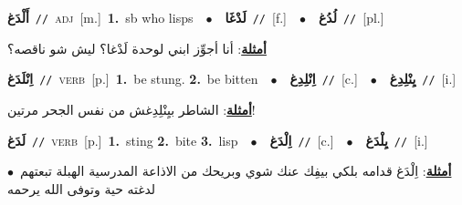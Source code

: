 \documentclass[10pt,a4paper,twoside]{article} %
\begin{document}
\begin{multicols}{2}
{\setlength\topsep{0pt}\textbf{\foreignlanguage{arabic}{أَلْدَغ}}\ {\color{gray}\texttt{//}\color{black}}\ \textsc{adj}\ [m.]\ \textbf{1.}~sb who lisps\ \ $\bullet$\ \ \setlength\topsep{0pt}\textbf{\foreignlanguage{arabic}{لَدْغَا}}\ {\color{gray}\texttt{//}\color{black}}\ [f.]\ \ $\bullet$\ \ \setlength\topsep{0pt}\textbf{\foreignlanguage{arabic}{لُدُغ}}\ {\color{gray}\texttt{//}\color{black}}\ [pl.]\  \begin{flushright}\color{gray}\foreignlanguage{arabic}{\textbf{\underline{\foreignlanguage{arabic}{أمثلة}}}: أنا أجوِّز ابني لوحدة لَدْغا؟ ليش شو ناقصه؟}\end{flushright}\color{black}} \vspace{2mm}

{\setlength\topsep{0pt}\textbf{\foreignlanguage{arabic}{اِنْلَدَغ}}\ {\color{gray}\texttt{//}\color{black}}\ \textsc{verb}\ [p.]\ \textbf{1.}~be stung.  \textbf{2.}~be bitten\ \ $\bullet$\ \ \setlength\topsep{0pt}\textbf{\foreignlanguage{arabic}{اِنْلِدِغ}}\ {\color{gray}\texttt{//}\color{black}}\ [c.]\ \ $\bullet$\ \ \setlength\topsep{0pt}\textbf{\foreignlanguage{arabic}{يِنْلِدِغ}}\ {\color{gray}\texttt{//}\color{black}}\ [i.]\  \begin{flushright}\color{gray}\foreignlanguage{arabic}{\textbf{\underline{\foreignlanguage{arabic}{أمثلة}}}: الشاطر بيِنْلِدِغش من نفس الجحر مرتين!}\end{flushright}\color{black}} \vspace{2mm}

{\setlength\topsep{0pt}\textbf{\foreignlanguage{arabic}{لَدَغ}}\ {\color{gray}\texttt{//}\color{black}}\ \textsc{verb}\ [p.]\ \textbf{1.}~sting  \textbf{2.}~bite  \textbf{3.}~lisp\ \ $\bullet$\ \ \setlength\topsep{0pt}\textbf{\foreignlanguage{arabic}{اِلْدَغ}}\ {\color{gray}\texttt{//}\color{black}}\ [c.]\ \ $\bullet$\ \ \setlength\topsep{0pt}\textbf{\foreignlanguage{arabic}{يِلْدَغ}}\ {\color{gray}\texttt{//}\color{black}}\ [i.]\  \begin{flushright}\color{gray}\foreignlanguage{arabic}{\textbf{\underline{\foreignlanguage{arabic}{أمثلة}}}: اِلْدَغ قدامه بلكي بيفِك عنك شوي وبريحك من الاذاعة المدرسية الهبلة تبعتهم\ $\bullet$\ \  لدغته حية وتوفى الله يرحمه}\end{flushright}\color{black}} \vspace{2mm}


\end{multicols}
\end{document}
